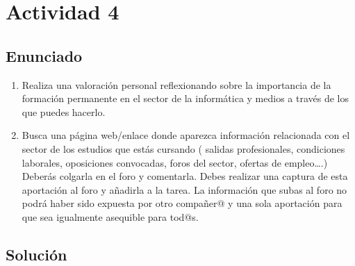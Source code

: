 \section{Actividad 4}
\subsection{Enunciado}

\begin{enumerate}[label={(\alph*)}]
    \item Realiza una valoración personal reflexionando sobre la importancia de la formación permanente en el sector de la informática y medios a través de los que puedes hacerlo.
    \item Busca una página web/enlace donde aparezca información relacionada con el sector de los estudios que estás cursando ( salidas profesionales, condiciones laborales, oposiciones convocadas,  foros del sector, ofertas de empleo….) Deberás colgarla en el foro y  comentarla. Debes realizar una captura de esta aportación al foro y añadirla a la tarea. La información que subas al foro no podrá haber sido expuesta por otro compañer@ y una sola aportación para que sea igualmente asequible para tod@s.
\end{enumerate}

\subsection{Solución}

